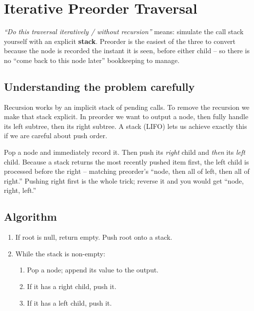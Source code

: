 \section{Iterative Preorder Traversal}
\label{sec:trees-iter-preorder}


\begin{patternbox}
\emph{``Do this traversal iteratively / without recursion''} means:
simulate the call stack yourself with an explicit \textbf{stack}. Preorder
is the easiest of the three to convert because the node is recorded the
instant it is seen, before either child -- so there is no ``come back to
this node later'' bookkeeping to manage.
\end{patternbox}

\subsection*{Understanding the problem carefully}

Recursion works by an implicit stack of pending calls. To remove the
recursion we make that stack explicit. In preorder we want to output a
node, then fully handle its left subtree, then its right subtree. A stack
(LIFO) lets us achieve exactly this if we are careful about push order.

\begin{ideabox}
Pop a node and immediately record it. Then push its \emph{right} child and
\emph{then} its \emph{left} child. Because a stack returns the most
recently pushed item first, the left child is processed before the right
-- matching preorder's ``node, then all of left, then all of right.''
Pushing right first is the whole trick; reverse it and you would get
``node, right, left.''
\end{ideabox}

\subsection*{Algorithm}

\begin{enumerate}
  \item If root is null, return empty. Push root onto a stack.
  \item While the stack is non-empty:
  \begin{enumerate}
    \item Pop a node; append its value to the output.
    \item If it has a right child, push it.
    \item If it has a left child, push it.
  \end{enumerate}
\end{enumerate}


